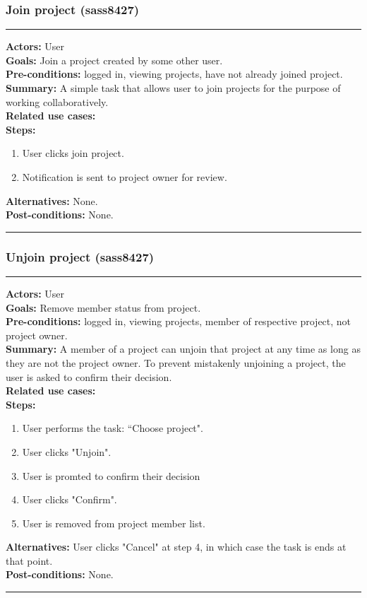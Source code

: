 \documentclass[11pt]{report}
\begin{document}
\subsubsection{Join project (sass8427)}
\vspace{2pt}
\hrule
\vspace{8pt}
 \textbf{Actors:} User \\ 
 \textbf{Goals:} Join a project created by some other user. \\
 \textbf{Pre-conditions:} logged in, viewing projects, have not already joined project.  \\
\textbf{Summary:} A simple task that allows user to join projects for the purpose of working collaboratively.\\ 
 \textbf{Related use cases:} \\ 
 \textbf{Steps:} \begin{enumerate}
  \item User clicks join project. 
  \item Notification is sent to project owner for review. 
 \end{enumerate}
 \textbf{Alternatives:} None. \\
 \textbf{Post-conditions:} None. \\
 \vspace{8pt}
\hrule
\newpage
\subsubsection{Unjoin project (sass8427)}
\vspace{2pt}
\hrule
\vspace{8pt}
 \textbf{Actors:} User \\ 
 \textbf{Goals:} Remove member status from project. \\
 \textbf{Pre-conditions:} logged in, viewing projects, member of respective project, not project owner.  \\
\textbf{Summary:} A member of a project can unjoin that project at any time as long as they are not the project owner. To prevent mistakenly unjoining a project, the user is asked to confirm their decision.\\ 
 \textbf{Related use cases:} \\ 
 \textbf{Steps:} \begin{enumerate}
  \item User performs the task: ``Choose project".
  \item User clicks "Unjoin". 
  \item User is promted to confirm their decision
  \item User clicks "Confirm".
  \item User is removed from project member list.    
 \end{enumerate}
 \textbf{Alternatives:} User clicks "Cancel" at step 4, in which case the task is ends at that point. \\
 \textbf{Post-conditions:} None. \\
 \vspace{8pt}
\hrule
\newpage
\end{document}
